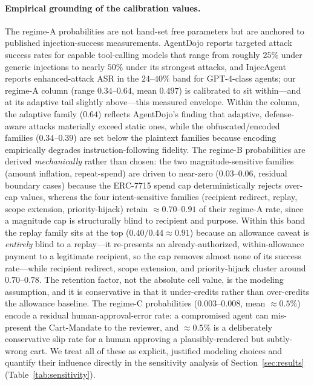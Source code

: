 \documentclass[10pt,twocolumn,letterpaper]{article}
\begin{document}
\paragraph{Empirical grounding of the calibration values.} The regime-A probabilities are not hand-set free parameters but are anchored to published injection-success measurements. AgentDojo \cite{agentdojo} reports targeted attack success rates for capable tool-calling models that range from roughly $25\%$ under generic injections to nearly $50\%$ under its strongest attacks, and InjecAgent \cite{injecagent} reports enhanced-attack ASR in the $24$--$40\%$ band for GPT-4-class agents; our regime-A column (range $0.34$--$0.64$, mean $0.497$) is calibrated to sit within---and at its adaptive tail slightly above---this measured envelope. Within the column, the adaptive family ($0.64$) reflects AgentDojo's finding that adaptive, defense-aware attacks materially exceed static ones, while the obfuscated/encoded families ($0.34$--$0.39$) are set below the plaintext families because encoding empirically degrades instruction-following fidelity. The regime-B probabilities are derived \emph{mechanically} rather than chosen: the two magnitude-sensitive families (amount inflation, repeat-spend) are driven to near-zero ($0.03$--$0.06$, residual boundary cases) because the ERC-7715 spend cap deterministically rejects over-cap values, whereas the four intent-sensitive families (recipient redirect, replay, scope extension, priority-hijack) retain $\approx 0.70$--$0.91$ of their regime-A rate, since a magnitude cap is structurally blind to recipient and purpose. Within this band the replay family sits at the top ($0.40/0.44\approx0.91$) because an allowance caveat is \emph{entirely} blind to a replay---it re-presents an already-authorized, within-allowance payment to a legitimate recipient, so the cap removes almost none of its success rate---while recipient redirect, scope extension, and priority-hijack cluster around $0.70$--$0.78$. The retention factor, not the absolute cell value, is the modeling assumption, and it is conservative in that it under-credits rather than over-credits the allowance baseline. The regime-C probabilities ($0.003$--$0.008$, mean $\approx 0.5\%$) encode a residual human-approval-error rate: a compromised agent can mis-present the Cart-Mandate to the reviewer, and $\approx 0.5\%$ is a deliberately conservative slip rate for a human approving a plausibly-rendered but subtly-wrong cart. We treat all of these as explicit, justified modeling choices and quantify their influence directly in the sensitivity analysis of Section~\ref{sec:results} (Table~\ref{tab:sensitivity}).
\end{document}
